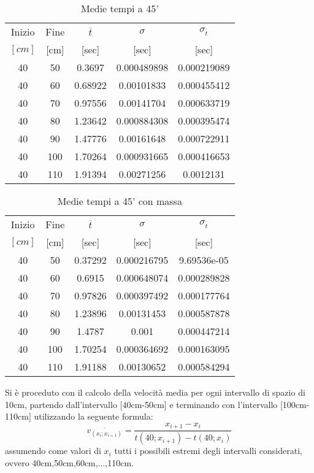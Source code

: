 \documentclass[a4paper,11pt,oneside]{article}
\begin{document}
\begin{table}[h]
\centering
\begin{tabular}{cc|ccc}
\toprule
Inizio&Fine&$\overline{t}$&$\sigma$&$\sigma_{\overline{t}}$\\
$[\si{cm}]$&[cm]&[sec]&[sec]&[sec]\\
\midrule
40 & 50  & 0.3697  & 0.000489898 & 0.000219089 \\
40 & 60  & 0.68922 & 0.00101833  & 0.000455412 \\
40 & 70  & 0.97556 & 0.00141704  & 0.000633719 \\
40 & 80  & 1.23642 & 0.000884308 & 0.000395474 \\
40 & 90  & 1.47776 & 0.00161648  & 0.000722911 \\
40 & 100 & 1.70264 & 0.000931665 & 0.000416653 \\
40 & 110 & 1.91394 & 0.00271256  & 0.0012131 \\
\bottomrule
\end{tabular}
    \caption{Medie tempi a 45'}
    \label{tab:45_primi}
\end{table}

\begin{table}[h]
\centering
\begin{tabular}{cc|ccc}
\toprule
Inizio&Fine&$\overline{t}$&$\sigma$&$\sigma_{\overline{t}}$\\
$[\si{cm}]$&[cm]&[sec]&[sec]&[sec]\\
\midrule
40 & 50  & 0.37292 & 0.000216795 & 9.69536e-05 \\
40 & 60  & 0.6915  & 0.000648074 & 0.000289828 \\
40 & 70  & 0.97826 & 0.000397492 & 0.000177764 \\
40 & 80  & 1.23896 & 0.00131453  & 0.000587878 \\
40 & 90  & 1.4787  & 0.001       & 0.000447214 \\
40 & 100 & 1.70254 & 0.000364692 & 0.000163095 \\
40 & 110 & 1.91188 & 0.00130652  & 0.000584294 \\
\bottomrule
\end{tabular}
    \caption{Medie tempi a 45' con massa}
    \label{tab:d45_primi}
\end{table}


Si è proceduto con il calcolo della velocità media per ogni intervallo di spazio di 10cm, partendo dall'intervallo [40cm-50cm] e terminando con l'intervallo [100cm-110cm] utilizzando la seguente formula:
\begin{equation*}
    \overline{v_{(x_i;x_{i+1})}}=\frac{x_{i+1}-x_i}{t(40;x_{i+1})-t(40;x_i)}
\end{equation*}
assumendo come valori di $x_i$ tutti i possibili estremi degli intervalli considerati, ovvero 40cm,50cm,60cm,...,110cm.
\end{document}
